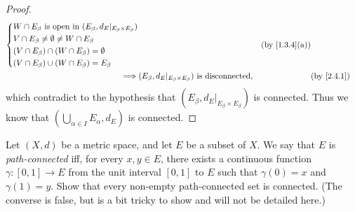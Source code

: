 \begin{proof}
\begin{align*}
\begin{dcases}
                 W \cap E_\beta \text{ is open in } (E_\beta, d_E|_{E_\beta \times E_\beta}) \\
                 V \cap E_\beta \neq \emptyset \neq W \cap E_\beta                           \\
                 (V \cap E_\beta) \cap (W \cap E_\beta) = \emptyset                          \\
                 (V \cap E_\beta) \cup (W \cap E_\beta) = E_\beta
               \end{dcases} &  & \text{(by \cref{1.3.4}(a))}                    \\
    \implies & (E_\beta, d_E|_{E_\beta \times E_\beta}) \text{ is disconnected},              &  & \by{2.4.1}
  \end{align*}
  which contradict to the hypothesis that \((E_\beta, d_E|_{E_\beta \times E_\beta})\) is connected.
  Thus we know that \((\bigcup_{\alpha \in I} E_\alpha, d_E)\) is connected.
\end{proof}

\begin{ex}\label{ex:2.4.7}
  Let \((X, d)\) be a metric space, and let \(E\) be a subset of \(X\).
  We say that \(E\) is \emph{path-connected} iff, for every \(x, y \in E\), there exists a continuous function \(\gamma : [0, 1] \to E\) from the unit interval \([0, 1]\) to \(E\) such that \(\gamma(0) = x\) and \(\gamma(1) = y\).
  Show that every non-empty path-connected set is connected.
  (The converse is false, but is a bit tricky to show and will not be detailed here.)
\end{ex}

